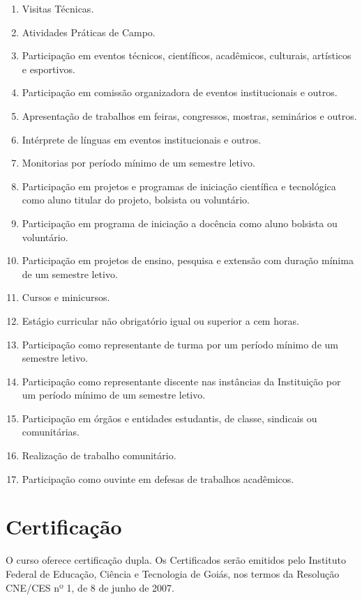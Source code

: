 \documentclass[
	10pt,				%
	openright,			%
	twoside,			%
	a4paper,			%
	english,			%
	french,				%
	brazil,				%
	sumario=tradicional
]{abntex2}
\begin{document}
\begin{enumerate}
	\item Visitas Técnicas.
	\item Atividades Práticas de Campo.
	\item Participação em eventos técnicos, científicos, acadêmicos, culturais, artísticos e esportivos.
	\item Participação em comissão organizadora de eventos institucionais e outros.
	\item Apresentação de trabalhos em feiras, congressos, mostras, seminários e outros.
	\item Intérprete de línguas em eventos institucionais e outros.
	\item Monitorias por período mínimo de um semestre letivo.
	\item Participação em projetos e programas de iniciação científica e tecnológica como aluno titular do projeto, bolsista ou voluntário.
	\item Participação em programa de iniciação a docência como aluno bolsista ou voluntário.
	\item Participação em projetos de ensino, pesquisa e extensão com duração mínima de um semestre letivo.
	\item Cursos e minicursos.
	\item Estágio curricular não obrigatório igual ou superior a cem horas.
	\item Participação como representante de turma por um período mínimo de um semestre letivo.
	\item Participação como representante discente nas instâncias da Instituição por um período mínimo de um semestre letivo.
	\item Participação em órgãos e entidades estudantis, de classe, sindicais ou comunitárias.
	\item Realização de trabalho comunitário.
	\item Participação como ouvinte em defesas de trabalhos acadêmicos.
\end{enumerate}


\section*{Certificação}

O curso oferece certificação dupla.
Os Certificados serão emitidos pelo Instituto Federal de Educação, Ciência e Tecnologia de Goiás, nos termos da Resolução CNE/CES nº 1, de 8 de junho de 2007.
\end{document}

